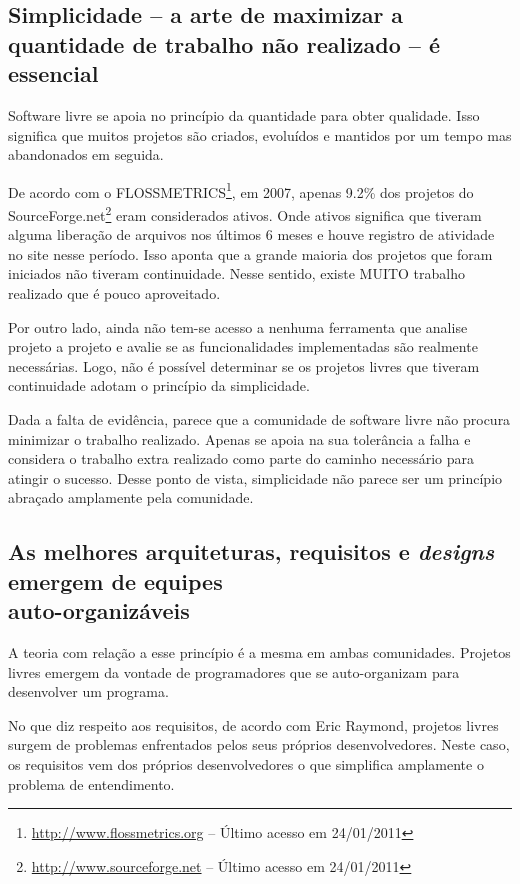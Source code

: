 \subsection[Simplicidade é essencial]{Simplicidade -- a arte de
  maximizar a quantidade de trabalho não realizado -- é essencial}

Software livre se apoia no princípio da quantidade para obter
qualidade. Isso significa que muitos projetos são criados, evoluídos e
mantidos por um tempo mas abandonados em seguida.

De acordo com o
FLOSSMETRICS\footnote{\url{http://www.flossmetrics.org} -- Último
  acesso em 24/01/2011}, em 2007, apenas 9.2\% dos projetos do
SourceForge.net\footnote{\url{http://www.sourceforge.net} -- Último acesso em
  24/01/2011} eram considerados ativos. Onde ativos significa que
tiveram alguma liberação de arquivos nos últimos 6 meses e houve
registro de atividade no site nesse período. Isso aponta que a grande
maioria dos projetos que foram iniciados não tiveram
continuidade. Nesse sentido, existe MUITO trabalho realizado que é
pouco aproveitado.

Por outro lado, ainda não tem-se acesso a nenhuma ferramenta que
analise projeto a projeto e avalie se as funcionalidades implementadas
são realmente necessárias. Logo, não é possível determinar se os
projetos livres que tiveram continuidade adotam o princípio da
simplicidade.

Dada a falta de evidência, parece que a comunidade de software livre
não procura minimizar o trabalho realizado. Apenas se apoia na sua
tolerância a falha e considera o trabalho extra realizado como parte
do caminho necessário para atingir o sucesso. Desse ponto de vista,
simplicidade não parece ser um princípio abraçado amplamente pela
comunidade.

\subsection[Equipes auto-organizáveis]{As melhores arquiteturas,
  requisitos e \textit{designs} emergem de equipes\\auto-organizáveis}

A teoria com relação a esse princípio é a mesma em ambas
comunidades. Projetos livres emergem da vontade de programadores que
se auto-organizam para desenvolver um programa.

No que diz respeito aos requisitos, de acordo com Eric Raymond,
projetos livres surgem de problemas enfrentados pelos seus próprios
desenvolvedores. Neste caso, os requisitos vem dos próprios
desenvolvedores o que simplifica amplamente o problema de
entendimento.

